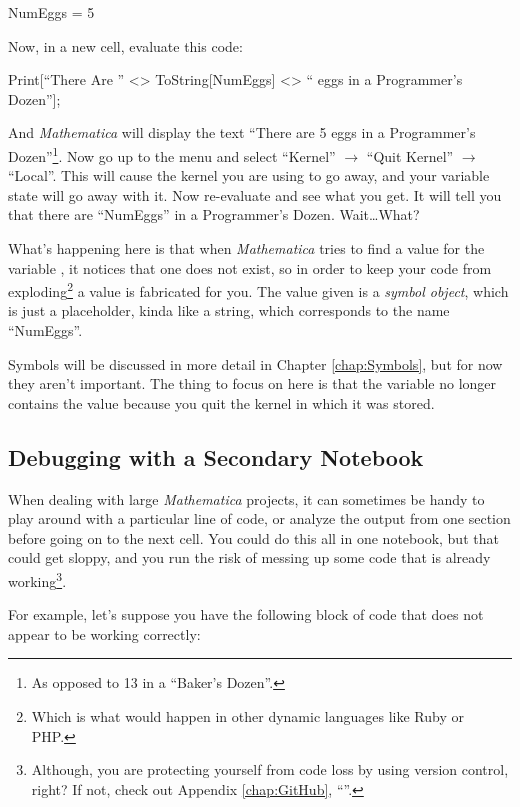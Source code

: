 \begin{code}
	   NumEggs = 5
\end{code}

Now, in a new cell, evaluate this code:

\begin{code}
	\label{code:PrintProgrammersDozen}
	Print[``There Are '' <> ToString[NumEggs] <> `` eggs in a Programmer's Dozen''];
\end{code}

And \emph{Mathematica} will display the text ``There are 5 eggs in a Programmer's Dozen''\footnote{As opposed to 13 in a ``Baker's Dozen''.}. Now go up to the menu and select ``Kernel'' $\rightarrow$ ``Quit Kernel'' $\rightarrow$ ``Local''. This will cause the kernel you are using to go away, and your variable state will go away with it. Now re-evaluate  and see what you get. It will tell you that there are ``NumEggs'' in a Programmer's Dozen. Wait\ldots What?

What's happening here is that when \emph{Mathematica} tries to find a value for the variable , it notices that one does not exist, so in order to keep your code from exploding\footnote{Which is what would happen in other dynamic languages like Ruby or PHP.} a value is fabricated for you. The value given is a \emph{symbol object}, which is just a placeholder, kinda like a string, which corresponds to the name ``NumEggs''.

Symbols will be discussed in more detail in Chapter \ref{chap:Symbols}, but for now they aren't important. The thing to focus on here is that the variable  no longer contains the value  because you quit the kernel in which it was stored.

\subsection{Debugging with a Secondary Notebook} When dealing with large \emph{Mathematica} projects, it can sometimes be handy to play around with a particular line of code, or analyze the output from one section before going on to the next cell. You could do this all in one notebook, but that could get sloppy, and you run the risk of messing up some code that is already working\footnote{Although, you are protecting yourself from code loss by using version control, right? If not, check out Appendix \ref{chap:GitHub}, ``''.}.

For example, let's suppose you have the following block of code that does not appear to be working correctly:

